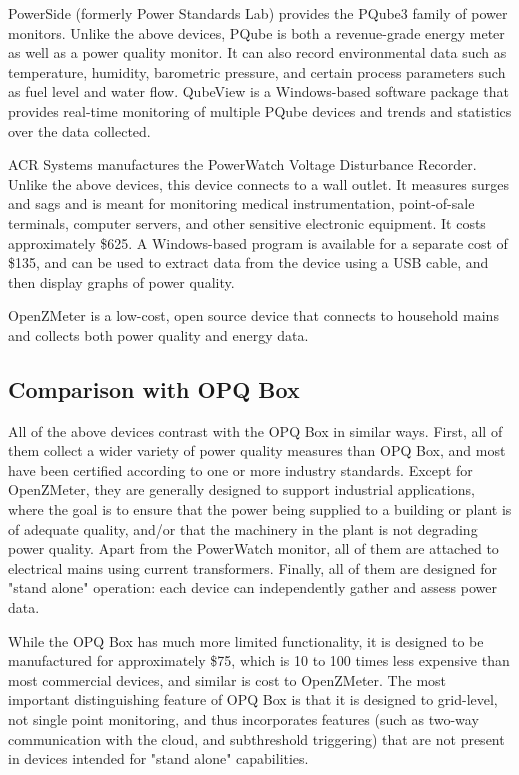PowerSide (formerly Power Standards Lab) \cite{powerside_powerside_2020} provides the PQube3 family of power monitors. Unlike the above devices, PQube is both a revenue-grade energy meter as well as a power quality monitor. It can also record environmental data such as temperature, humidity, barometric pressure, and certain process parameters such as fuel level and water flow. QubeView is a Windows-based software package that provides real-time monitoring of multiple PQube devices and trends and statistics over the data collected.

ACR Systems \cite{acr_acr_2020} manufactures the PowerWatch Voltage Disturbance Recorder. Unlike the above devices, this device connects to a wall outlet. It measures surges and sags and is meant for monitoring medical instrumentation, point-of-sale terminals, computer servers, and other sensitive electronic equipment. It costs approximately \$625. A Windows-based program is available for a separate cost of \$135, and can be used to extract data from the device using a USB cable, and then display graphs of power quality.

OpenZMeter \cite{viciana_openzmeter_2018} is a low-cost, open source device that connects to household mains and collects both power quality and energy data.

\subsection*{Comparison with OPQ Box}

All of the above devices contrast with the OPQ Box in similar ways. First, all of them collect a wider variety of power quality measures than OPQ Box, and most have been certified according to one or more industry standards. Except for OpenZMeter, they are generally designed to support industrial applications, where the goal is to ensure that the power being supplied to a building or plant is of adequate quality, and/or that the machinery in the plant is not degrading power quality. Apart from the PowerWatch monitor, all of them are attached to electrical mains using current transformers. Finally, all of them are designed for "stand alone" operation: each device can independently gather and assess power data.

While the OPQ Box has much more limited functionality, it is designed to be manufactured for approximately \$75, which is 10 to 100 times less expensive than most commercial devices, and similar is cost to OpenZMeter. The most important distinguishing feature of OPQ Box is that it is designed to grid-level, not single point monitoring, and thus incorporates features (such as two-way communication with the cloud, and subthreshold triggering) that are not present in devices intended for "stand alone" capabilities.

